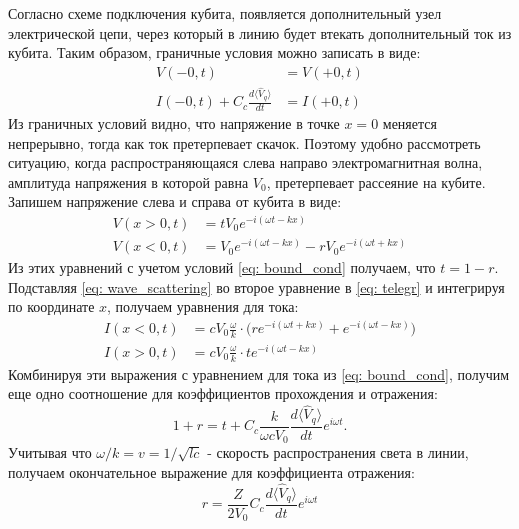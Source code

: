 Согласно схеме подключения кубита, появляется дополнительный узел электрической цепи, через который в линию будет втекать дополнительный ток из кубита. Таким образом, граничные условия можно записать в виде:
\begin{equation}
\begin{split}
	V(-0,t) &= V(+0,t) \\
	I(-0,t) + C_c\frac{d \langle \hat{V}_q \rangle }{dt} &= I(+0,t)
	\label{eq: bound_cond}
\end{split}
\end{equation}
Из граничных условий видно, что напряжение в точке $x\!=\!0$ меняется непрерывно, тогда как ток претерпевает скачок. Поэтому удобно рассмотреть ситуацию, когда распространяющаяся слева направо электромагнитная волна, амплитуда напряжения в которой равна $V_0$, претерпевает рассеяние на кубите. Запишем напряжение слева и справа от кубита в виде:
\begin{equation}
\begin{split}
V(x>0,t) &= t V_0 e^{-i(\omega t - k x)} \\
V(x<0,t) &= V_0 e^{-i(\omega t - k x)} - r V_0 e^{-i(\omega t + k x)} 
\label{eq: wave_scattering}
\end{split}
\end{equation}
Из этих уравнений с учетом условий \eqref{eq: bound_cond} получаем, что $t=1-r$. Подставляя \eqref{eq: wave_scattering} во второе уравнение в \eqref{eq: telegr} и интегрируя по координате $x$, получаем уравнения для тока:
\begin{equation}
\begin{split}
I(x<0,t) &= c V_0 \frac{\omega}{k}\cdot \big( re^{-i(\omega t + k x)} + e^{-i(\omega t - k x)}\big)\\
I(x>0,t) &= c V_0 \frac{\omega}{k} \cdot te^{-i(\omega t - k x)}
\end{split}
\label{eq: cur}
\end{equation}
Комбинируя эти выражения с уравнением для тока из \eqref{eq: bound_cond}, получим еще одно соотношение для коэффициентов прохождения и отражения:
\begin{equation}
1 + r = t + C_c\frac{k}{\omega cV_0}\frac{d \langle \hat{V}_q \rangle }{dt}e^{i\omega t}.
\end{equation}
Учитывая что $\omega/k=v=1/\sqrt{lc}$ - скорость распространения света в линии, получаем окончательное выражение для коэффициента отражения:
\begin{equation}
r = \frac{Z}{2V_0}C_c\frac{d\langle\hat{V}_q\rangle}{dt} e^{i\omega t}
\label{eq: r_derived}
\end{equation}  
